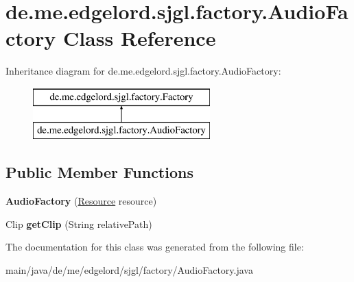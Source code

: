 \hypertarget{classde_1_1me_1_1edgelord_1_1sjgl_1_1factory_1_1_audio_factory}{}\section{de.\+me.\+edgelord.\+sjgl.\+factory.\+Audio\+Factory Class Reference}
\label{classde_1_1me_1_1edgelord_1_1sjgl_1_1factory_1_1_audio_factory}
Inheritance diagram for de.\+me.\+edgelord.\+sjgl.\+factory.\+Audio\+Factory\+:\begin{figure}[H]
\begin{center}
\leavevmode
\includegraphics[height=2.000000cm]{classde_1_1me_1_1edgelord_1_1sjgl_1_1factory_1_1_audio_factory}
\end{center}
\end{figure}
\subsection*{Public Member Functions}
\begin{DoxyCompactItemize}
\item 
\mbox{\label{classde_1_1me_1_1edgelord_1_1sjgl_1_1factory_1_1_audio_factory_a1c79976e97184fa86c9ad1340d795758}} 
{\bfseries Audio\+Factory} (\mbox{\hyperlink{interfacede_1_1me_1_1edgelord_1_1sjgl_1_1resource_1_1_resource}{Resource}} resource)
\item 
\mbox{\label{classde_1_1me_1_1edgelord_1_1sjgl_1_1factory_1_1_audio_factory_a55a67186897bbcb9fad6d93250e7e3a9}} 
Clip {\bfseries get\+Clip} (String relative\+Path)
\end{DoxyCompactItemize}


The documentation for this class was generated from the following file\+:\begin{DoxyCompactItemize}
\item 
main/java/de/me/edgelord/sjgl/factory/Audio\+Factory.\+java\end{DoxyCompactItemize}
